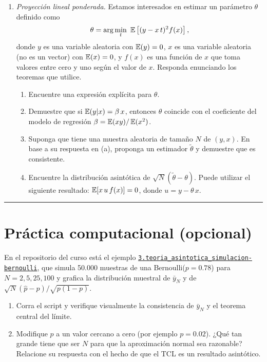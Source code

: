 \documentclass[letterpaper,11pt]{article}
\begin{document}
\begin{enumerate}[itemsep=1.2em]
\item \emph{Proyección lineal ponderada.} Estamos interesados en estimar un parámetro $\theta$
    definido como
    \begin{align*}
    \theta = \arg\min_t\ \operatorname{\mathbb{E}}\left[(y-x\,t)^2 f(x)\right],
    \end{align*}
    donde $y$ es una variable aleatoria con $\operatorname{\mathbb{E}}(y)=0$, $x$ es una variable aleatoria (no es un
    vector) con $\operatorname{\mathbb{E}}(x)=0$, y $f(x)$ es una función de $x$ que toma valores entre cero y uno
    según el valor de $x$. Responda enunciando los teoremas que utilice.
    \begin{enumerate}
        \item Encuentre una expresión explícita para $\theta$.
        \item Demuestre que si $\operatorname{\mathbb{E}}(y|x)=\beta\,x$, entonces $\theta$ coincide con el coeficiente
              del modelo de regresión $\beta=\operatorname{\mathbb{E}}(xy)/\operatorname{\mathbb{E}}(x^2)$.
        \item Suponga que tiene una muestra aleatoria de tamaño $N$ de $(y,x)$. En base a su
              respuesta en (a), proponga un estimador $\tilde\theta$ y demuestre que es consistente.
        \item Encuentre la distribución asintótica de $\sqrt{N}(\tilde\theta-\theta)$. Puede
              utilizar el siguiente resultado: $\operatorname{\mathbb{E}}[x\,u\,f(x)]=0$, donde $u=y-\theta\,x$.
    \end{enumerate}

\end{enumerate}

\vspace{1em}
\noindent\rule{\textwidth}{0.4pt}

\section*{Práctica computacional (opcional)}

\noindent En el repositorio del curso está el ejemplo
\href{https://github.com/ramirode/econometria_mae/tree/main/examples/3.teoria_asintotica_simulacion-bernoulli}%
{\texttt{3.teoria\_asintotica\_simulacion-bernoulli}}, que simula 50.000 muestras de una
Bernoulli($p=0.78$) para $N=2,5,25,100$ y grafica la distribución muestral de $\bar y_N$ y de
$\sqrt{N}(\hat p - p)/\sqrt{p(1-p)}$.

\begin{enumerate}[itemsep=0.6em]
    \item Corra el script y verifique visualmente la consistencia de $\bar y_N$ y el teorema
          central del límite.
    \item Modifique $p$ a un valor cercano a cero (por ejemplo $p=0.02$). ¿Qué tan grande tiene
          que ser $N$ para que la aproximación normal sea razonable? Relacione su respuesta con
          el hecho de que el TCL es un resultado asintótico.
\end{enumerate}
\end{document}
